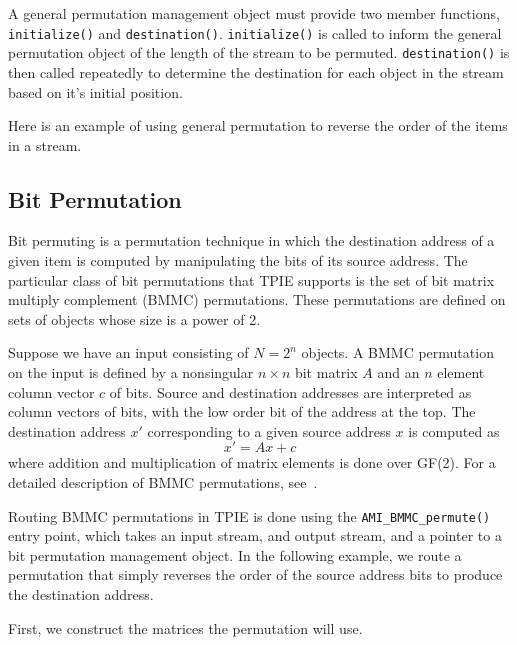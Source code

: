 A general permutation management object must provide two member
functions, \lstinline|initialize()| and \lstinline|destination()|.
\lstinline|initialize()| is called to inform the general permutation
object of the length of the stream to be permuted.
\lstinline|destination()| is then called repeatedly to determine the
destination for each object in the stream based on it's initial
position.

Here is an example of using general permutation to reverse the order
of the items in a stream.




\subsection{Bit Permutation}


Bit permuting is a permutation technique in which the destination
address of a given item is computed by manipulating the bits of its
source address.  The particular class of bit permutations that TPIE
supports is the set of bit matrix multiply complement (BMMC)
permutations.  These permutations are defined on sets of objects whose
size is a power of 2.

Suppose we have an input consisting of $N = 2^n$ objects.  A BMMC
permutation on the input is defined by a nonsingular $n \times n$ bit
matrix $A$ and an $n$ element column vector $c$ of bits.  Source and
destination addresses are interpreted as column vectors of bits, with
the low order bit of the address at the top. The destination address
$x'$ corresponding to a given source address $x$ is computed as
$$x' = Ax + c$$
where addition and multiplication of matrix elements
is done over GF(2). For a detailed description of BMMC permutations,
see~\cite{cormen:integrate-tr}.

Routing BMMC permutations in TPIE is done using the
\lstinline|AMI_BMMC_permute()| entry point, which takes an input stream, and output stream, and a
pointer to a bit permutation management object. In the following
example, we route a permutation that simply reverses the order of the
source address bits to produce the destination address.

First, we construct the matrices the permutation will use.

